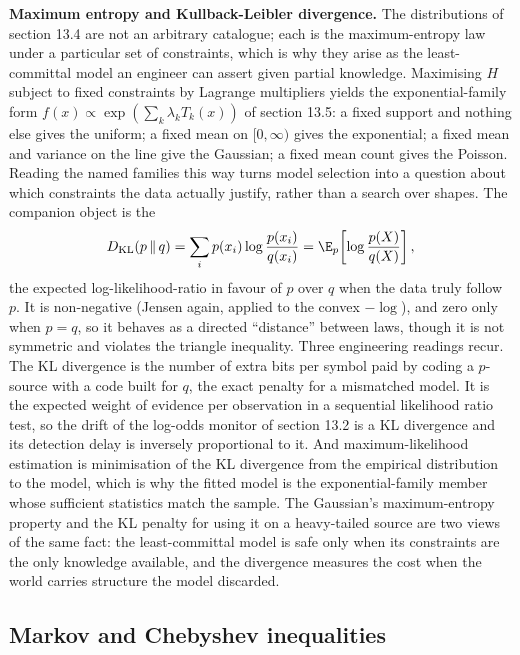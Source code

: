 \begin{mastery}
\textbf{Maximum entropy and Kullback-Leibler divergence.} The
distributions of section 13.4 are not an arbitrary catalogue; each is the
maximum-entropy law under a particular set of constraints, which is why
they arise as the least-committal model an engineer can assert given
partial knowledge. Maximising $H$ subject to fixed constraints by
Lagrange multipliers yields the exponential-family form $f(x) \propto
\exp(\sum_{k}\lambda_{k}T_{k}(x))$ of section 13.5: a fixed support and
nothing else gives the uniform; a fixed mean on $[0, \infty)$ gives the
exponential; a fixed mean and variance on the line give the Gaussian; a
fixed mean count gives the Poisson. Reading the named families this way
turns model selection into a question about which constraints the data
actually justify, rather than a search over shapes. The companion object
is the 
\[
D_{\mathrm{KL}}(p \,\|\, q) = \sum_{i} p(x_{i})
\log\frac{p(x_{i})}{q(x_{i})}
= \E_{p}\!\left[\log\frac{p(X)}{q(X)}\right],
\]
the expected log-likelihood-ratio in favour of $p$ over $q$ when the data
truly follow $p$. It is non-negative (Jensen again, applied to the convex
$-\log$), and zero only when $p = q$, so it behaves as a directed
``distance'' between laws, though it is not symmetric and violates the
triangle inequality. Three engineering readings recur. The KL divergence
is the number of extra bits per symbol paid by coding a $p$-source with a
code built for $q$, the exact penalty for a mismatched model. It is the
expected weight of evidence per observation in a sequential likelihood
ratio test, so the drift of the log-odds monitor of section 13.2 is a KL
divergence and its detection delay is inversely proportional to it. And
maximum-likelihood estimation is minimisation of the KL divergence from
the empirical distribution to the model, which is why the fitted model is
the exponential-family member whose sufficient statistics match the
sample. The Gaussian's maximum-entropy property and the KL penalty for
using it on a heavy-tailed source are two views of the same fact: the
least-committal model is safe only when its constraints are the only
knowledge available, and the divergence measures the cost when the world
carries structure the model discarded.
\end{mastery}

\subsection{Markov and Chebyshev inequalities}

